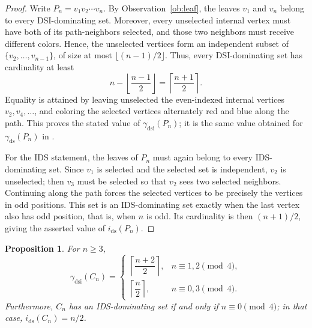 \documentclass[11pt]{article}
\newtheorem{proposition}[theorem]{Proposition}
\theoremstyle{definition}
\theoremstyle{remark}
\newcommand{\ds}{\mathrm{ds}}
\newcommand{\dsi}{\mathrm{dsi}}
\begin{document}
\begin{proof}
Write \(P_n=v_1v_2\cdots v_n\). By Observation~\ref{ob:leaf}, the leaves \(v_1\) and \(v_n\) belong to
every DSI-dominating set. Moreover, every unselected internal vertex must have
both of its path-neighbors selected, and those two neighbors must receive
different colors. Hence, the unselected vertices form an independent subset of
\(\{v_2,\ldots,v_{n-1}\}\), of size at most
\(\lfloor (n-1)/2\rfloor\). Thus, every DSI-dominating set has cardinality at
least
\[
   n-\left\lfloor\frac{n-1}{2}\right\rfloor
   =\left\lceil\frac{n+1}{2}\right\rceil.
\]
Equality is attained by leaving unselected the even-indexed internal vertices
\(v_2,v_4,\ldots\), and coloring the selected vertices alternately red and
blue along the path. This proves the stated value of \(\gamma_{\dsi}(P_n)\);
it is the same value obtained for \(\gamma_{\ds}(P_n)\) in \cite{chh}.

For the IDS statement, the leaves of \(P_n\) must again belong to every
IDS-dominating set. Since \(v_1\) is selected and the selected set is
independent, \(v_2\) is unselected; then \(v_3\) must be selected so that
\(v_2\) sees two selected neighbors. Continuing along the path forces the
selected vertices to be precisely the vertices in odd positions. This set is
an IDS-dominating set exactly when the last vertex also has odd position, that
is, when \(n\) is odd. Its cardinality is then \((n+1)/2\), giving the
asserted value of \(i_{\ds}(P_n)\).
\end{proof}

\begin{proposition}
\label{prop:cycle-values}
For \(n\ge 3\),
\[
\gamma_{\dsi}(C_n)=
   \begin{cases}
      \left\lceil \dfrac{n+2}{2}\right\rceil, & n\equiv 1,2 \pmod 4,\\[1.4ex]
      \left\lceil \dfrac{n}{2}\right\rceil, & n\equiv 0,3 \pmod 4.
   \end{cases}
\]
Furthermore, \(C_n\) has an IDS-dominating set if and only if
\(n\equiv 0\pmod 4\); in that case, \(i_{\ds}(C_n)=n/2\).
\end{proposition}
\end{document}
